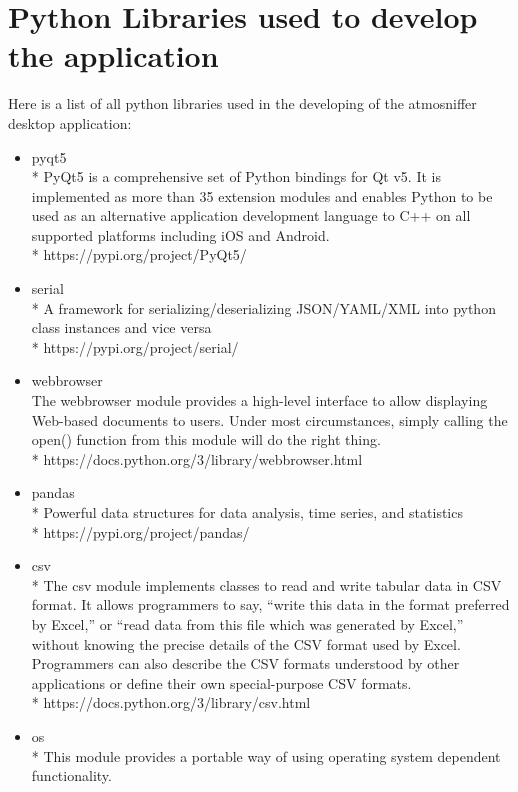 \chapter{Python Libraries used to develop the application} %
	Here is a list of all python libraries used in the developing of the atmosniffer desktop application:
\begin{itemize}
	\item pyqt5
		\\* PyQt5 is a comprehensive set of Python bindings for Qt v5. It is implemented as more than 35 extension modules and enables Python to be used as an alternative application development language to C++ on all supported platforms including iOS and Android. \cite{pyqt5}
		\\* https://pypi.org/project/PyQt5/
	\item serial
		\\*  A framework for serializing/deserializing JSON/YAML/XML into python class instances and vice versa \cite{serial}
		\\* https://pypi.org/project/serial/
	\item webbrowser
		\\ The webbrowser module provides a high-level interface to allow displaying Web-based documents to users. Under most circumstances, simply calling the open() function from this module will do the right thing. \cite{webbrowser}
		\\* https://docs.python.org/3/library/webbrowser.html
	\item pandas
		\\* Powerful data structures for data analysis, time series, and statistics \cite{pandas}
		\\* https://pypi.org/project/pandas/
	\item csv
		\\* The csv module implements classes to read and write tabular data in CSV format. It allows programmers to say, “write this data in the format preferred by Excel,” or “read data from this file which was generated by Excel,” without knowing the precise details of the CSV format used by Excel. Programmers can also describe the CSV formats understood by other applications or define their own special-purpose CSV formats. \cite{csv}
		\\* https://docs.python.org/3/library/csv.html
	\item os
		\\* This module provides a portable way of using operating system dependent functionality. \cite{os}

\end{itemize}

